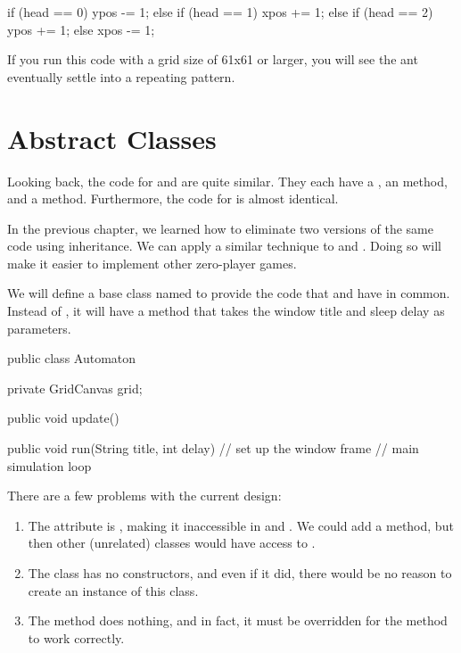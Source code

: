 \begin{code}
if (head == 0) {
    ypos -= 1;
} else if (head == 1) {
    xpos += 1;
} else if (head == 2) {
    ypos += 1;
} else {
    xpos -= 1;
}
\end{code}

If you run this code with a grid size of 61x61 or larger, you will see the ant eventually settle into a repeating pattern.


\section{Abstract Classes}

Looking back, the code for  and  are quite similar.
They each have a , an  method, and a  method.
Furthermore, the code for  is almost identical.

In the previous chapter, we learned how to eliminate two versions of the same code using inheritance.
We can apply a similar technique to  and .
Doing so will make it easier to implement other zero-player games.


We will define a base class named  to provide the code that  and  have in common.
Instead of , it will have a  method that takes the window title and sleep delay as parameters.

\begin{code}
public class Automaton {
    private GridCanvas grid;

    public void update() {
    }

    public void run(String title, int delay) {
        // set up the window frame
        // main simulation loop
    }
}
\end{code}

There are a few problems with the current design:
\begin{enumerate}
\item The  attribute is , making it inaccessible in  and .
We could add a  method, but then other (unrelated) classes would have access to .
\item The  class has no constructors, and even if it did, there would be no reason to create an instance of this class.
\item The  method does nothing, and in fact, it must be overridden for the  method to work correctly.
\end{enumerate}

